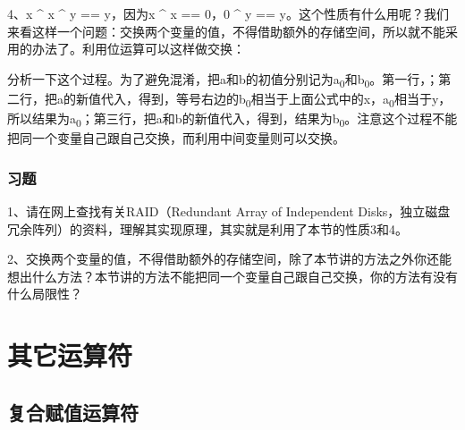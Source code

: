4、x \textasciicircum{} x \textasciicircum{} y == y，因为x \textasciicircum{} x == 0，0 \textasciicircum{} y == y。这个性质有什么用呢？我们来看这样一个问题：交换两个变量的值，不得借助额外的存储空间，所以就不能采用的办法了。利用位运算可以这样做交换：




分析一下这个过程。为了避免混淆，把a和b的初值分别记为a\textsubscript{0}和b\textsubscript{0}。第一行，；第二行，把a的新值代入，得到，等号右边的b\textsubscript{0}相当于上面公式中的x，a\textsubscript{0}相当于y，所以结果为a\textsubscript{0}；第三行，把a和b的新值代入，得到，结果为b\textsubscript{0}。注意这个过程不能把同一个变量自己跟自己交换，而利用中间变量则可以交换。


\subsubsection*{习题}
%


1、请在网上查找有关RAID（Redundant Array of Independent Disks，独立磁盘冗余阵列）的资料，理解其实现原理，其实就是利用了本节的性质3和4。



2、交换两个变量的值，不得借助额外的存储空间，除了本节讲的方法之外你还能想出什么方法？本节讲的方法不能把同一个变量自己跟自己交换，你的方法有没有什么局限性？




\section{其它运算符}
%
\subsection{复合赋值运算符}
%


